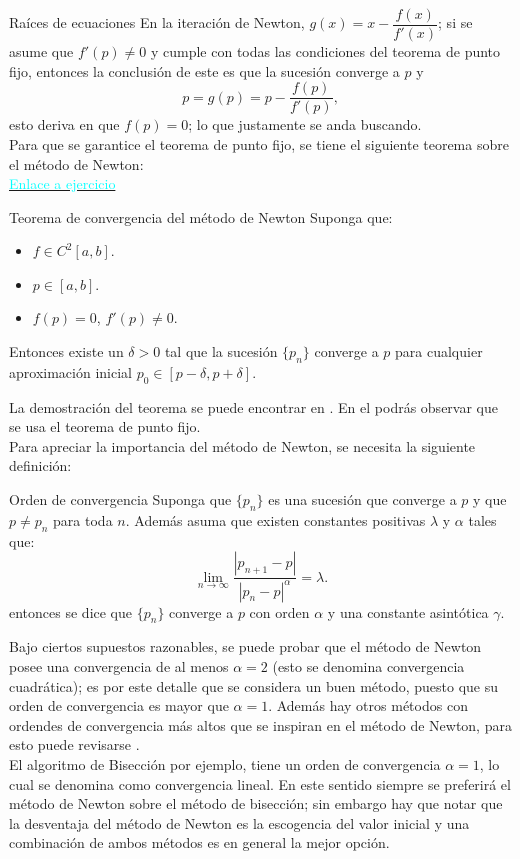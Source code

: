 \begin{frame}{Raíces de ecuaciones}
\indent En la iteración de Newton, $g(x)=x-\dfrac{f(x)}{f'(x)}$; si se asume que $f'(p)\neq 0$ y cumple con todas las condiciones del teorema de punto fijo, entonces la conclusión de este es que la sucesión converge a $p$ y
$$p=g(p)=p-\dfrac{f(p)}{f'(p)},$$
esto deriva en que $f(p)=0$; lo que justamente se anda buscando.\\
\indent Para que se garantice el teorema de punto fijo, se tiene el siguiente teorema sobre el método de Newton:\\
\hyperlink{EjercicioNewton}{\textcolor{cyan}{Enlace a ejercicio}}
\begin{block}{Teorema de convergencia del método de Newton}
Suponga que:
\begin{itemize}
\item $f\in C^2[a,b]$.
\item $p\in [a,b]$.
\item $f(p)=0$, $f'(p)\neq 0.$
\end{itemize}
Entonces existe un $\delta>0$ tal que la sucesión $\{p_n\}$ converge a $p$ para cualquier aproximación inicial $p_0\in [p-\delta,p+\delta].$
\end{block}
\indent La demostración del teorema se puede encontrar en \textcolor{gray}{\cite{burden2017análisis}}. En el podrás observar que se usa el teorema de punto fijo.\\ 
\indent Para apreciar la importancia del método de Newton, se necesita la siguiente definición:
\framebreak
\begin{block}{Orden de convergencia}
Suponga que $\{p_n\}$ es una sucesión que converge a $p$ y que $p\neq p_n$ para toda $n$. Además asuma que existen constantes positivas $\lambda$ y $\alpha$ tales que:
$$\lim_{n\rightarrow \infty}\dfrac{|p_{n+1}-p|}{|p_n-p|^\alpha}=\lambda.$$
entonces se dice que $\{p_n\}$ converge a $p$ con orden $\alpha$ y una constante asintótica $\gamma$.
\end{block}
\indent Bajo ciertos supuestos razonables, se puede probar que el método de Newton posee una convergencia de al menos $\alpha=2$ (esto se denomina convergencia  cuadrática); es por este detalle que se considera un buen método, puesto que su orden de convergencia es mayor que $\alpha=1$. Además hay otros métodos con ordendes de convergencia más altos que se inspiran en el método de Newton, para esto puede revisarse \textcolor{gray}{\cite{xiao2015simple}}.\\
\indent El algoritmo de Bisección por ejemplo, tiene un orden de convergencia $\alpha=1$, lo cual se denomina como convergencia lineal. En este sentido siempre se preferirá el método de Newton sobre el método de bisección; sin embargo hay que notar que la desventaja del método de Newton es la escogencia del valor inicial y una combinación de ambos métodos es en general la mejor opción.\\

\end{frame}
